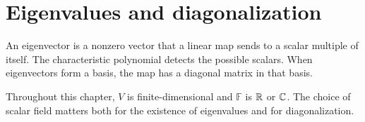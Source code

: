\chapter{Eigenvalues and diagonalization}
\label{ch:linear-algebra-i:eigenvalues-and-diagonalization}

An eigenvector is a nonzero vector that a linear map sends to a scalar
multiple of itself. The characteristic polynomial detects the possible
scalars. When eigenvectors form a basis, the map has a diagonal matrix
in that basis.

Throughout this chapter, \(V\) is finite-dimensional and
\(\mathbb F\) is \(\mathbb{R}\) or \(\mathbb{C}\). The choice of scalar field matters
both for the existence of eigenvalues and for diagonalization.







